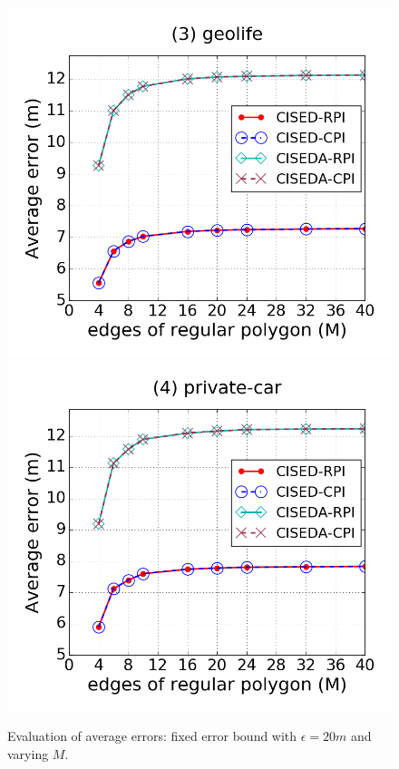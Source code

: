\begin{figure}[tb!]
\includegraphics[scale = 0.245]{figures/Exp-M-e-20-error-geolife.png}
\includegraphics[scale = 0.245]{figures/Exp-M-e-20-error-private.png}
\vspace{-2ex}
\caption{\small Evaluation of average errors: fixed error bound with $\epsilon = 20m$ and varying $M$.}
\label{fig:m-error-e20}
\vspace{-1ex}
\end{figure}

